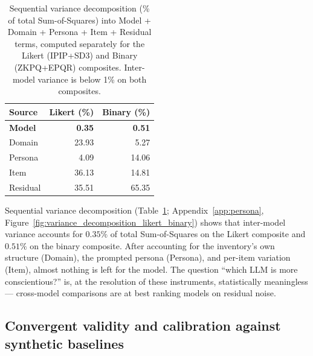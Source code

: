 \documentclass[11pt]{article}
\begin{document}
\begin{table}[t]
\centering
\small
\begin{tabular}{lrr}
\toprule
Source & Likert (\%) & Binary (\%) \\
\midrule
\textbf{Model}    & \textbf{0.35} & \textbf{0.51} \\
Domain   & 23.93 & 5.27  \\
Persona  & 4.09  & 14.06 \\
Item     & 36.13 & 14.81 \\
Residual & 35.51 & 65.35 \\
\bottomrule
\end{tabular}
\caption{Sequential variance decomposition (\% of total Sum-of-Squares) into Model + Domain + Persona + Item + Residual terms, computed separately for the Likert (IPIP+SD3) and Binary (ZKPQ+EPQR) composites. Inter-model variance is below 1\% on both composites.}
\label{tab:variance}
\end{table}

Sequential variance decomposition (Table~\ref{tab:variance}; Appendix~\ref{app:persona}, Figure~\ref{fig:variance_decomposition_likert_binary}) shows that inter-model variance accounts for $0.35\%$ of total Sum-of-Squares on the Likert composite and $0.51\%$ on the binary composite. After accounting for the inventory's own structure (Domain), the prompted persona (Persona), and per-item variation (Item), almost nothing is left for the model. The question ``which LLM is more conscientious?'' is, at the resolution of these instruments, statistically meaningless --- cross-model comparisons are at best ranking models on residual noise.

\subsection{Convergent validity and calibration against synthetic baselines}
\label{sec:results-convergent}
\end{document}
